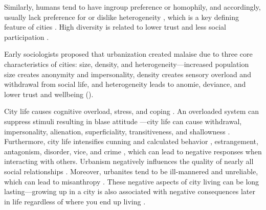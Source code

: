 \documentclass[11pt, letterpaper]{article}
\begin{document}
\begin{spacing}{1.4}
Similarly, humans tend to have ingroup preference or homophily, and
accordingly, usually lack preference for or dislike heterogeneity
\citep{smith14,mcpherson01,bleidorn16,putnam07}, which is a key defining feature
of cities \citep{wirth38,amin06,thrift05}. High diversity is related to lower trust and less social participation \citep{alesina99,alesina00,luttmer01,alesina02,rodriguez2019does}. %


Early sociologists  
 proposed that urbanization created malaise due to three core characteristics of cities: size, density, and heterogeneity---increased population size creates anonymity and
 impersonality, density creates sensory overload and withdrawal from social
 life, and heterogeneity leads to anomie, deviance, and lower trust and wellbeing (\citet{park84,
   simmel03, tonnies57, wirth38,putnam07,aok_brfss_segregation15,herbst14,postmes02,vogt07,smelser99}).
%





City life causes cognitive overload, stress, and coping \citep{simmel03, milgram70,lederbogen11}. An overloaded system can suppress stimuli resulting in blase attitude
\citep{simmel03}---city life can cause withdrawal, impersonality, alienation, superficiality, transitiveness, and shallowness \citep{wirth38}. Furthermore, city life intensifies cunning and calculated behavior \citep{tonnies57}, estrangement, antagonism, disorder, vice, and crime
\citep{milgram70,park15,park84,bettencourt10b}, which can lead to negative 
responses when interacting with others.
%
Urbanism negatively influences the quality of nearly all social relationships
\citep{wilson85}. Moreover, urbanites tend to be ill-mannered and unreliable,
which can lead to misanthropy
\citep[e.g.,][]{aokCityBook15,aok-sizeFetish17}. These negative aspects of city living can be long lasting---growing up in a city is also associated with negative consequences later in life regardless of where you end up living \citep{lederbogen11,aok20}.


\end{spacing}
\end{document}
